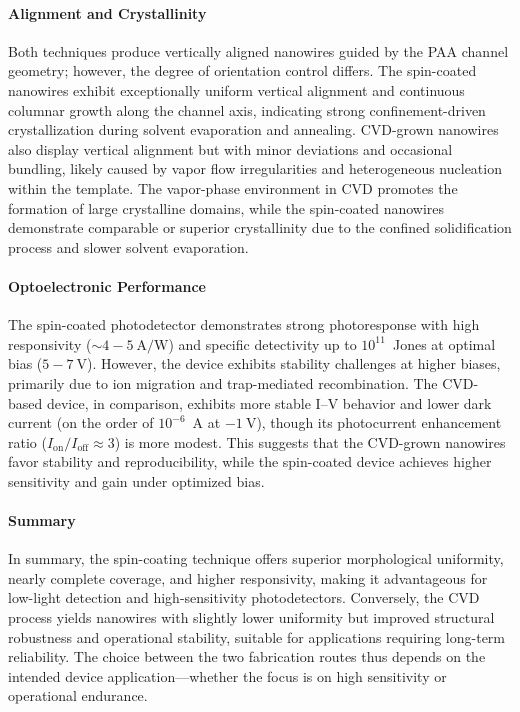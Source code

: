 \documentclass{rapportCS}
\begin{document}
	\paragraph{Alignment and Crystallinity}
	
	Both techniques produce vertically aligned nanowires guided by the PAA channel geometry; however, the degree of orientation control differs. The spin-coated nanowires exhibit exceptionally uniform vertical alignment and continuous columnar growth along the channel axis, indicating strong confinement-driven crystallization during solvent evaporation and annealing. CVD-grown nanowires also display vertical alignment but with minor deviations and occasional bundling, likely caused by vapor flow irregularities and heterogeneous nucleation within the template. The vapor-phase environment in CVD promotes the formation of large crystalline domains, while the spin-coated nanowires demonstrate comparable or superior crystallinity due to the confined solidification process and slower solvent evaporation.
	
	\paragraph{Optoelectronic Performance}
	
	The spin-coated photodetector demonstrates strong photoresponse with high responsivity ($\sim 4{-}5~\mathrm{A/W}$) and specific detectivity up to $10^{11}$~Jones at optimal bias ($5{-}7~\mathrm{V}$). However, the device exhibits stability challenges at higher biases, primarily due to ion migration and trap-mediated recombination. The CVD-based device, in comparison, exhibits more stable I–V behavior and lower dark current (on the order of $10^{-6}$~A at $-1~\mathrm{V}$), though its photocurrent enhancement ratio ($I_{\text{on}}/I_{\text{off}} \approx 3$) is more modest. This suggests that the CVD-grown nanowires favor stability and reproducibility, while the spin-coated device achieves higher sensitivity and gain under optimized bias.
	
	\paragraph{Summary}
	
	In summary, the spin-coating technique offers superior morphological uniformity, nearly complete coverage, and higher responsivity, making it advantageous for low-light detection and high-sensitivity photodetectors. Conversely, the CVD process yields nanowires with slightly lower uniformity but improved structural robustness and operational stability, suitable for applications requiring long-term reliability. The choice between the two fabrication routes thus depends on the intended device application—whether the focus is on high sensitivity or operational endurance.
	
	
	\newpage
	
	
\end{document}
